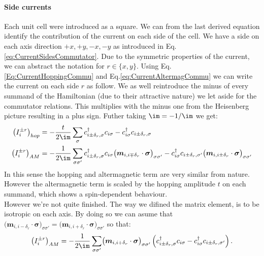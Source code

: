 \documentclass[../main.tex]{subfile}
\begin{document}
\paragraph{Side currents}
Each unit cell were introduced as a square. We can from the last derived equation identify the contribution of the current on each side of the cell. We have a side on 
each axis direction $+x, +y, -x, -y$ as introduced in Eq.\ref{eq:CurrentSidesCommutator}. Due to the symmetric properties of the current, we can abstract the notation
for $r\in\{x,y\}$. Using Eq.\ref{Eq:CurrentHoppingCommu} and Eq.\ref{eq:CurrentAltermagCommu} we can write the current on each side $r$ as follow.
We as well reintroduce the minus of every summand of the Hamiltonian (due to their attractive nature) we let aside for the commutator relations. This multiplies 
with the minus one from the Heisenberg picture resulting in a plus sign. Futher taking $\im = -1/\im$ we get:
\begin{align}
    \left(I_{i}^{\pm r}\right)_{hop} &= -\frac{t}{2\im}\sum_{\sigma}c_{i\pm\delta_r,\sigma}^{\dagger}c_{i\sigma} -c_{i\sigma}^{\dagger}c_{i\pm\delta_r,\sigma}  \\
    \left(I_{i}^{\pm r}\right)_{AM} &=  -\frac{1}{2\im}\sum_{\sigma\sigma'}c_{i\pm\delta_r,\sigma}^{\dagger}c_{i\sigma}\bigl(\bm{m}_{i,i\mp\delta_r}\cdot\bm{\sigma}\bigr)_{\sigma\sigma'} - c_{i\sigma}^{\dagger}c_{i\pm\delta_r,\sigma'}\bigl(\bm{m}_{i,i\pm\delta_r}\cdot\bm{\sigma}\bigr)_{\sigma\sigma'} 
\end{align}
In this sense the hopping and altermagnetic term are very similar from nature. However the altermagnetic term is scaled by the hopping amplitude $t$ on each summand, 
which shows a spin-dependent behaviour.\\

However we're not quite finished. The way we difined the matrix element, is to be isotropic on each axis. By doing so we can 
asume that $\bigl(\bm{m}_{i,i-\delta_r}\cdot\bm{\sigma}\bigr)_{\sigma\sigma'} = \bigl(\bm{m}_{i,i+\delta_r}\cdot\bm{\sigma}\bigr)_{\sigma\sigma'}$ so that:
\begin{equation}
    \left(I_{i}^{\pm r}\right)_{AM} =  -\frac{1}{2\im}\sum_{\sigma\sigma'}\bigl(\bm{m}_{i,i+\delta_r}\cdot\bm{\sigma}\bigr)_{\sigma\sigma'}\left(c_{i\pm\delta_r,\sigma}^{\dagger}c_{i\sigma} - c_{i\sigma}^{\dagger}c_{i\pm\delta_r,\sigma'}\right).
\end{equation}
\end{document}
